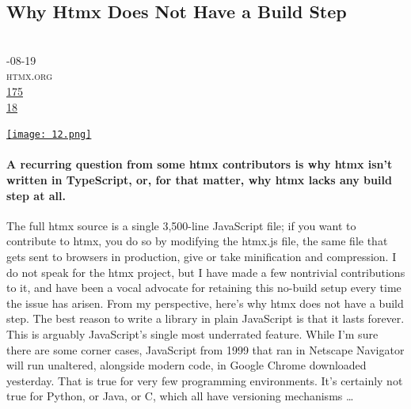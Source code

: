 \documentclass[10pt,a4paper]{article}
\begin{document}
\subsection{Why Htmx Does Not Have a Build Step}
\noindent\begin{minipage}[t]{0.19\linewidth}
\vspace{0pt}
\noindent\scshape\footnotesize
\\ {\scriptsize\faCalendar}-08-19
\\ {\scriptsize\faGlobe}\space 
htmx.org
\\ {\scriptsize\faThumbsOUp}\space 
\href{http://news.ycombinator.com/item?id=37265097\&utm\_term=comment}{175} 
\\ {\scriptsize\faComments}\space 
\href{http://news.ycombinator.com/item?id=37265097\&utm\_term=comment}{18} 
\end{minipage} 
\begin{minipage}[t]{0.80\linewidth}
\vspace{0pt}
\begin{multicols}{2}
    \href{https://htmx.org/essays/no-build-step/?utm\_source=hackernewsletter\&utm\_medium=email\&utm\_term=fav}{
        \texttt{[image: 12.png]}
    }
\paragraph{A recurring question from some htmx contributors is why htmx isn’t written in TypeScript, or, for that matter, why htmx lacks any build step at all.}
 The full htmx source is a single 3,500-line JavaScript file; if you want to contribute to htmx, you do so by modifying the
htmx.js file, the same file that gets sent to browsers in production, give or take minification and compression.
I do not speak for the htmx project, but I have made a few nontrivial contributions to it, and have been a vocal advocate for retaining this no-build setup every time the issue has arisen. From my perspective, here’s why htmx does not have a build step.
The best reason to write a library in plain JavaScript is that it lasts forever. This is arguably JavaScript’s single most underrated feature. While I’m sure there are some corner cases, JavaScript from 1999 that ran in Netscape Navigator will run unaltered, alongside modern code, in Google Chrome downloaded yesterday. That is true for very few programming environments. It’s certainly not true for Python, or Java, or C, which all have versioning mechanisms 
\dots
\end{multicols}
\end{minipage}
\par\medskip
\newpage
\end{document}
